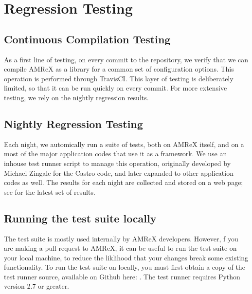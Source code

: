 \documentclass[letterpaper,10pt,english]{sphinxmanual}
\begin{document}
\chapter{Regression Testing}
\label{\detokenize{Regression_Testing_Chapter:regression-testing}}\label{\detokenize{Regression_Testing_Chapter:chap-regression-testing}}\label{\detokenize{Regression_Testing_Chapter::doc}}

\section{Continuous Compilation Testing}
\label{\detokenize{Testing:continuous-compilation-testing}}\label{\detokenize{Testing::doc}}
\sphinxAtStartPar
As a first line of testing, on every commit to the repository, we verify that we can compile
AMReX as a library for a common set of configuration options. This operation is performed
through Travis\sphinxhyphen{}CI. This layer of testing is deliberately limited, so that it can be run
quickly on every commit. For more extensive testing, we rely on the nightly regression results.


\section{Nightly Regression Testing}
\label{\detokenize{Testing:nightly-regression-testing}}
\sphinxAtStartPar
Each night, we automically run a suite of tests, both on AMReX itself, and on a most of the major
application codes that use it as a framework. We use an in\sphinxhyphen{}house test runner script to manage this
operation, originally developed by Michael Zingale for the Castro code, and later expanded to other
application codes as well. The results for each night are collected and stored on a web page; see
 for the latest set of results.


\section{Running the test suite locally}
\label{\detokenize{Testing:running-the-test-suite-locally}}
\sphinxAtStartPar
The test suite is mostly used internally by AMReX developers. However,
f you are making a pull request to AMReX, it can be useful to run the test suite
on your local machine, to reduce the liklihood that your changes break some existing functionality.
To run the test suite on locally, you must first obtain a copy of the test runner source, available
on Github here: . The test runner requires Python
version 2.7 or greater.
\end{document}
